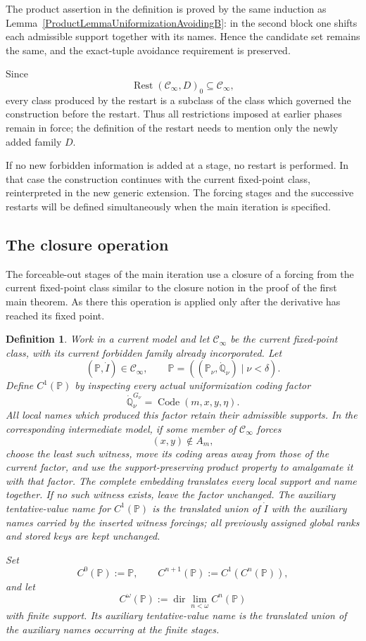 \documentclass[a4paper,11pt]{article}
\newtheorem{definition}[theorem]{Definition}
\newcommand{\forceP}{\mathbb{P}}
\newcommand{\forceQ}{\mathbb{Q}}
\begin{document}
The product assertion in the definition is proved by the same induction as Lemma~\ref{ProductLemmaUniformizationAvoidingB}: in the second block one shifts each admissible support together with its names. Hence the candidate set remains the same, and the exact-tuple avoidance requirement is preserved.

Since
\[
\operatorname{Rest}(\mathcal C_\infty,D)_0\subseteq\mathcal C_\infty,
\]
every class produced by the restart is a subclass of the class which governed the construction before the restart. Thus all restrictions imposed at earlier phases remain in force; the definition of the restart needs to mention only the newly added family $D$.

If no new forbidden information is added at a stage, no restart is performed. In that case the construction continues with the current fixed-point class, reinterpreted in the new generic extension. The forcing stages and the successive restarts will be defined simultaneously when the main iteration is specified.

\subsection{The closure operation}

The forceable-out stages of the main iteration use a closure of a forcing from the current fixed-point class similar to the closure notion in the proof of the first main theorem. As there this operation is applied only after the derivative has reached its fixed point.

\begin{definition}\label{UniformizationClosureDefinition}
Work in a current model and let $\mathcal C_\infty$ be the current fixed-point class, with its current forbidden family already incorporated. Let
\[
(\forceP,\dot I)\in\mathcal C_\infty,
\qquad
\forceP=((\forceP_\nu,\dot{\forceQ}_\nu)\mid\nu<\delta).
\]
Define $C^1(\forceP)$ by inspecting every actual uniformization coding factor
\[
\dot{\forceQ}_\nu^{G_\nu}
=\operatorname{Code}(m,x,y,\eta).
\]
All local names which produced this factor retain their admissible supports. In the corresponding intermediate model, if some member of $\mathcal C_\infty$ forces
\[
(x,y)\notin A_m,
\]
choose the least such witness, move its coding areas away from those of the current factor, and use the support-preserving product property to amalgamate it with that factor. The complete embedding translates every local support and name together. If no such witness exists, leave the factor unchanged. The auxiliary tentative-value name for $C^1(\forceP)$ is the translated union of $\dot I$ with the auxiliary names carried by the inserted witness forcings; all previously assigned global ranks and stored keys are kept unchanged.

Set
\[
C^0(\forceP):=\forceP,
\qquad
C^{n+1}(\forceP):=C^1(C^n(\forceP)),
\]
and let
\[
C^\omega(\forceP)
:=\operatorname{dir}\lim_{n<\omega}C^n(\forceP)
\]
with finite support. Its auxiliary tentative-value name is the translated union of the auxiliary names occurring at the finite stages.
\end{definition}
\end{document}
